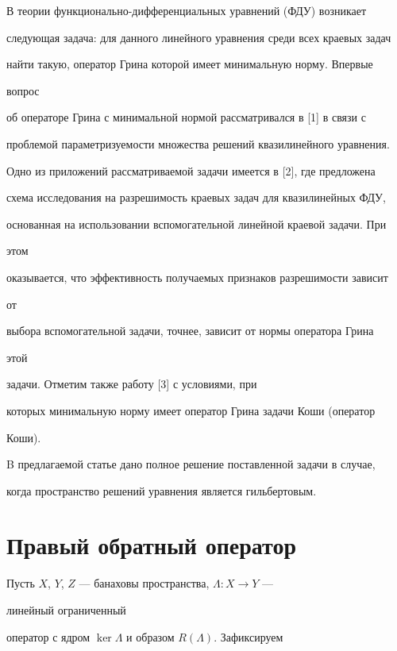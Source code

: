  


В теории функционально-дифференциальных уравнений (ФДУ) возникает  


следующая задача: для данного линейного уравнения среди всех краевых задач  


найти такую, оператор Грина которой имеет минимальную норму. Впервые 


вопрос  


об операторе Грина с минимальной нормой рассматривался в [1] в связи с  


проблемой параметризуемости множества решений квазилинейного уравнения.  


Одно из приложений рассматриваемой задачи имеется в [2], где предложена  


схема исследования на разрешимость краевых задач для квазилинейных ФДУ,  


основанная на использовании вспомогательной линейной краевой задачи. При 


этом  


оказывается, что эффективность получаемых признаков разрешимости зависит 


от 


выбора вспомогательной задачи, точнее, зависит от нормы оператора Грина 


этой 


задачи. Отметим также работу [3] с условиями, при 


которых минимальную норму имеет оператор Грина задачи Коши (оператор 


Коши). 


 


B предлагаемой статье дано полное решение поставленной задачи в случае,  


когда пространство решений уравнения является гильбертовым. 


 


\section{Правый обратный оператор} 


 


Пусть $X$, $Y$, $Z$ --- банаховы пространства, $\Lambda:X\to Y$ --- 


линейный ограниченный  


оператор с ядром $\ker\Lambda$ и образом $R(\Lambda)$. Зафиксируем 


